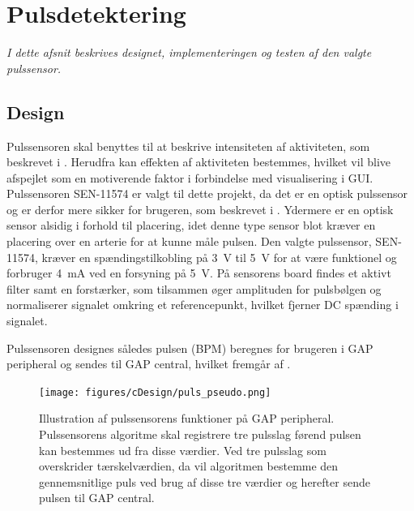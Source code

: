 \section{Pulsdetektering}\label{sec_de_im_te_puls}
\textit{I dette afsnit beskrives designet, implementeringen og testen af den valgte pulssensor.}

\subsection{Design} \label{sec_design_puls}
Pulssensoren skal benyttes til at beskrive intensiteten af aktiviteten, som beskrevet i . Herudfra kan effekten af aktiviteten bestemmes, hvilket vil blive afspejlet som en motiverende faktor i forbindelse med visualisering i GUI. \newline
Pulssensoren SEN-11574 er valgt til dette projekt, da det er en optisk pulssensor og er derfor mere sikker for brugeren, som beskrevet i . Ydermere er en optisk sensor alsidig i forhold til placering, idet denne type sensor blot kræver en placering over en arterie for at kunne måle pulsen. \newline
Den valgte pulssensor, SEN-11574, kræver en spændingstilkobling på 3~V til 5~V for at være funktionel og forbruger 4~mA ved en forsyning på 5~V. På sensorens board findes et aktivt filter samt en forstærker, som tilsammen øger amplituden for pulsbølgen og normaliserer signalet omkring et referencepunkt, hvilket fjerner DC spænding i signalet. \citep{Murphy2016,Murphy2016_sensor}

Pulssensoren designes således pulsen (BPM) beregnes for brugeren i GAP peripheral og sendes til GAP central, hvilket fremgår af .

\begin{figure}[H]
	\centering
	\texttt{[image: figures/cDesign/puls\_pseudo.png]}
	\caption{Illustration af pulssensorens funktioner på GAP peripheral. Pulssensorens algoritme skal registrere tre pulsslag førend pulsen kan bestemmes ud fra disse værdier. Ved tre pulsslag som overskrider tærskelværdien, da vil algoritmen bestemme den gennemsnitlige puls ved brug af disse tre værdier og herefter sende pulsen til GAP central.}
	\label{fig:puls_pseudo}
\end{figure}

